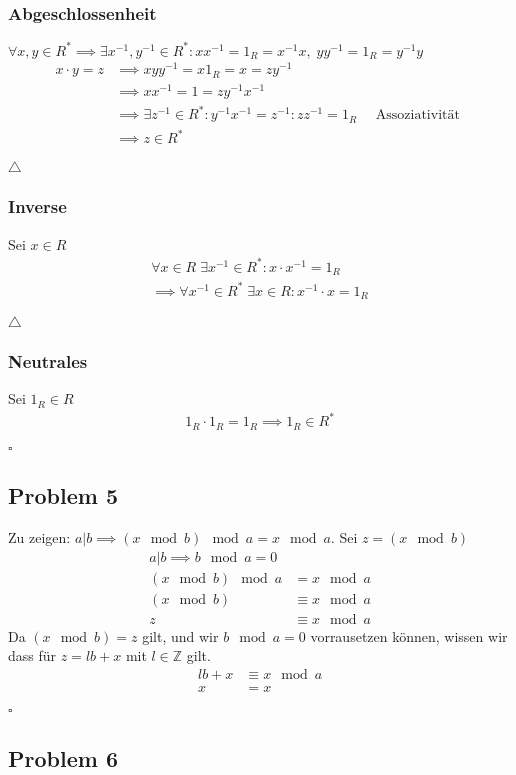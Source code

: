 \documentclass[12pt, german]{article}
\newcommand{\bewiesen}{\begin{flushright}$\square$ \end{flushright} }
\newcommand{\teilsbewiesen}{\begin{flushright}$\triangle$ \end{flushright} }
\begin{document}
    	\subsubsection*{Abgeschlossenheit}
    	 $\forall  x,y \in R^\ast \implies \exists x^{-1}, y^{-1} \in R^\ast : xx^{-1} = 1_R = x^{-1}x, \; yy^{-1} = 1_R = y^{-1}y $
    	\begin{align*}
    		x \cdot y = z &\implies xyy^{-1} = x1_R=x=zy^{-1} \\
    		&\implies xx^{-1} = 1 = zy^{-1}x^{-1} \\
    		&\implies \exists z^{-1} \in R^\ast : y^{-1}x^{-1} = z^{-1} : zz^{-1} = 1_R  \quad \text{ Assoziativität }\\
    			&\implies z \in R^\ast
    	\end{align*} \teilsbewiesen
    	\subsubsection*{Inverse}
    	Sei $x \in R$ 
    		\begin{align*} 
    		 \forall  x \in R \; \exists x^{-1} \in R^\ast : x\cdot x^{-1} = 1_R  \\
    		 \implies \forall x^{-1} \in R^\ast \; \exists x \in R : x^{-1} \cdot x = 1_R
    	\end{align*} \teilsbewiesen
    	
    	\subsubsection*{Neutrales}
    		Sei $1_R \in R$ 
    		\begin{align*}
    			1_R \cdot 1_R = 1_R \implies 1_R \in R^\ast
    	\end{align*} \bewiesen
   
    \subsection*{Problem 5}
    Zu zeigen: 	$a | b \implies (x \mod b) \mod a = x \mod a $. Sei $z =(x \mod b)$ 
    \begin{align*}
    	a | b \implies b \mod a = 0 \\
    	(x \mod b) \mod a &= x \mod a  \\
    	(x \mod b) &\equiv x \mod a \\ 
		z &\equiv x \mod a     
    \end{align*}
    Da $(x \mod b) = z$  gilt, und wir $b \mod a = 0$ vorrausetzen können, wissen wir dass für $z = lb + x$ mit $l \in \mathbb{Z}$ gilt. 
    \begin{align*}
    lb + x &\equiv x \mod a     \\
     x &= x
    \end{align*} \bewiesen
    \newpage
    \subsection*{Problem 6}
    		
    
    
    
\end{document}
